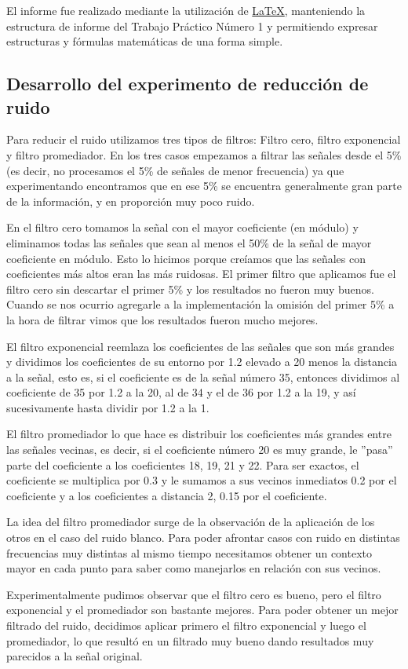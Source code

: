 El informe fue realizado mediante la utilizaci\'on de \href{http://www.latex-project.org/}{LaTeX},
 manteniendo la estructura de informe del Trabajo Pr\'actico N\'umero 1 y
permitiendo expresar estructuras y f\'ormulas matem\'aticas de una forma simple.

\subsection{Desarrollo del experimento de reducci\'on de ruido}

Para reducir el ruido utilizamos tres tipos de filtros: Filtro cero, filtro exponencial y filtro promediador.
En los tres casos empezamos a filtrar las se\~nales desde el 5\% (es decir, no procesamos el 5\% de se\~nales
de menor frecuencia) ya que experimentando encontramos que en ese 5\% se encuentra generalmente gran parte de
la informaci\'on, y en proporci\'on muy poco ruido.

En el filtro cero tomamos la se\~nal con el mayor coeficiente (en m\'odulo) y eliminamos todas las se\~nales que sean
al menos el 50\% de la se\~nal de mayor coeficiente en m\'odulo. Esto lo hicimos porque cre\'iamos que las se\~nales
con coeficientes m\'as altos eran las m\'as ruidosas.
El primer filtro que aplicamos fue el filtro cero sin descartar el primer 5\% y los resultados no fueron muy buenos.
Cuando se nos ocurrio agregarle a la implementaci\'on la omisi\'on del primer 5\% a la hora de filtrar vimos que los 
resultados fueron mucho mejores.

El filtro exponencial reemlaza los coeficientes de las se\~nales que son m\'as grandes y dividimos los coeficientes de su entorno por 1.2 elevado a 20 menos la distancia a la se\~nal, esto es, si el coeficiente es de la se\~nal n\'umero 35, entonces dividimos al coeficiente de 35 por 1.2 a la 20, al de 34 y el de 36 por 1.2 a la 19, y as\'i sucesivamente hasta dividir por 1.2 a la 1.

El filtro promediador lo que hace es distribuir los coeficientes m\'as grandes entre las se\~nales vecinas, es decir, si el coeficiente n\'umero 20 es muy grande, le ''pasa'' parte del coeficiente a los coeficientes 18, 19, 21 y 22. Para ser exactos, el coeficiente se multiplica por 0.3 y le sumamos a sus vecinos inmediatos 0.2 por el coeficiente y a los coeficientes a distancia 2, 0.15 por el coeficiente.

La idea del filtro promediador surge de la observaci\'on de la aplicaci\'on de
los otros en el caso del ruido blanco. Para poder afrontar casos con ruido en
distintas frecuencias muy distintas al mismo tiempo necesitamos obtener un
contexto mayor en cada punto para saber como manejarlos en relaci\'on con sus
vecinos.

Experimentalmente pudimos observar que el filtro cero es bueno, pero el filtro exponencial y el promediador son bastante mejores. Para poder obtener un mejor filtrado del ruido, decidimos aplicar primero el filtro exponencial y luego el promediador, lo que result\'o en un filtrado muy bueno dando resultados muy parecidos a la se\~nal original.
